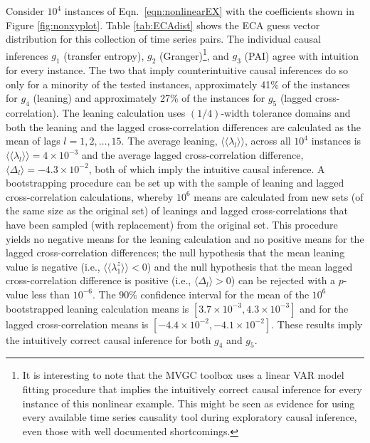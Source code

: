 \documentclass{article}[10pt]
\begin{document}
Consider $10^4$ instances of Eqn.\ \ref{eqn:nonlinearEX} with the coefficients shown in Figure \ref{fig:nonxyplot}.  Table \ref{tab:ECAdist} shows the ECA guess vector distribution for this collection of time series pairs.  The individual causal inferences $g_1$ (transfer entropy), $g_2$ (Granger)\footnote{It is interesting to note that the MVGC toolbox uses a linear VAR model fitting procedure that implies the intuitively correct causal inference for every instance of this nonlinear example.  This might be seen as evidence for using every available time series causality tool during exploratory causal inference, even those with well documented shortcomings.}, and $g_3$ (PAI) agree with intuition for every instance.  The two that imply counterintuitive causal inferences do so only for a minority of the tested instances, approximately 41\% of the instances for $g_4$ (leaning) and approximately 27\% of the instances for $g_5$ (lagged cross-correlation).  The leaning calculation uses $(1/4)$-width tolerance domains and both the leaning and the lagged cross-correlation differences are calculated as the mean of lags $l=1,2,\ldots,15$.  The average leaning, $\langle\langle\lambda_l\rangle\rangle$, across all $10^4$ instances is $\langle\langle\lambda_l\rangle\rangle = 4\times 10^{-3}$ and the average lagged cross-correlation difference, $\langle\Delta_l\rangle=-4.3\times 10^{-2}$, both of which imply the intuitive causal inference.  A bootstrapping \cite{Efron1994} procedure can be set up with the sample of leaning and lagged cross-correlation calculations, whereby $10^6$ means are calculated from new sets (of the same size as the original set) of leanings and lagged cross-correlations that have been sampled (with replacement) from the original set.  This procedure yields no negative means for the leaning calculation and no positive means for the lagged cross-correlation differences; the null hypothesis that the mean leaning value is negative (i.e., $\langle\langle\lambda_1^z\rangle\rangle < 0$) and the null hypothesis that the mean lagged cross-correlation difference is positive (i.e., $\langle\Delta_l\rangle > 0$) can be rejected with a $p$-value less than $10^{-6}$.  The $90\%$ confidence interval for the mean of the $10^6$ bootstrapped leaning calculation means is $[3.7\times 10^{-3},4.3\times 10^{-3}]$ and for the lagged cross-correlation means is $[-4.4\times 10^{-2},-4.1\times 10^{-2}]$.  These results imply the intuitively correct causal inference for both $g_4$ and $g_5$.
\end{document}
